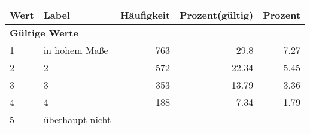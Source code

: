     \begin{longtable}{lXrrr}
     \toprule
     \textbf{Wert} & \textbf{Label} & \textbf{Häufigkeit} & \textbf{Prozent(gültig)} & \textbf{Prozent} \\
     \endhead
     \midrule
     \multicolumn{5}{l}{\textbf{Gültige Werte}}\\

     1 &
     \multicolumn{1}{X}{ in hohem Maße   } &


       \num{763} &
       \num[round-mode=places,round-precision=2]{29,8} &
         \num[round-mode=places,round-precision=2]{7,27} \\

     2 &
     \multicolumn{1}{X}{ 2   } &


       \num{572} &
       \num[round-mode=places,round-precision=2]{22,34} &
         \num[round-mode=places,round-precision=2]{5,45} \\

     3 &
     \multicolumn{1}{X}{ 3   } &


       \num{353} &
       \num[round-mode=places,round-precision=2]{13,79} &
         \num[round-mode=places,round-precision=2]{3,36} \\

     4 &
     \multicolumn{1}{X}{ 4   } &


       \num{188} &
       \num[round-mode=places,round-precision=2]{7,34} &
         \num[round-mode=places,round-precision=2]{1,79} \\

     5 &
     \multicolumn{1}{X}{ überhaupt nicht   } &



\end{longtable}
